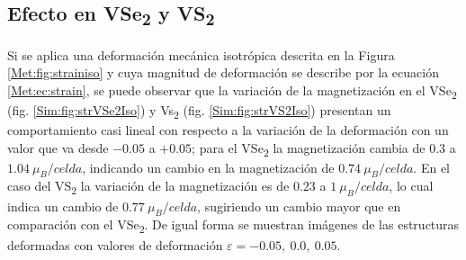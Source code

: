 \subsection{Efecto en VSe\textsubscript{2} y VS\textsubscript{2}}
Si se aplica una deformaci\'on mec\'anica isotr\'opica descrita en la Figura \ref{Met:fig:strainiso} y cuya magnitud de deformaci\'on se describe por la ecuaci\'on \ref{Met:ec:strain}, se puede observar que la variaci\'on de la magnetizaci\'on en el VSe\textsubscript{2} (fig. \ref{Sim:fig:strVSe2Iso}) y Vs\textsubscript{2} (fig. \ref{Sim:fig:strVS2Iso}) presentan  un comportamiento casi lineal con respecto a la variaci\'on de la deformaci\'on con  un valor que va desde $-0.05$ a $+0.05$; para el  VSe\textsubscript{2} la magnetizaci\'on cambia de $0.3$ a $1.04 ~\mu_B/celda$,  indicando un cambio en la magnetizaci\'on de $0.74~\mu_{B}/celda$. En el caso del VS\textsubscript{2} la variaci\'on de la magnetizaci\'on es de $0.23$ a $1 ~ \mu_{B}/celda$, lo cual indica un cambio   de  $0.77~\mu_{B}/celda$, sugiriendo un cambio mayor que en comparaci\'on con el VSe\textsubscript{2}. De igual forma se muestran im\'agenes de las estructuras deformadas con  valores de deformaci\'on  $\varepsilon= -0.05,~0.0,~0.05$. 

